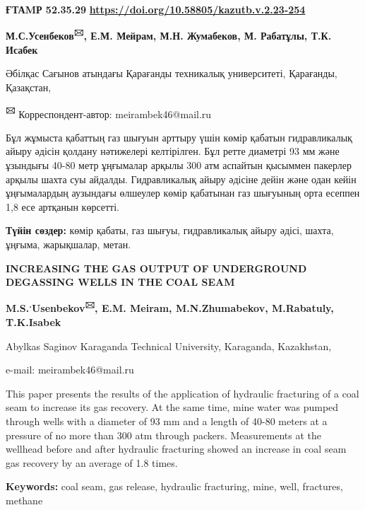 \newpage
{\bfseries ҒТАMР 52.35.29}
\hfill {\bfseries \href{https://doi.org/10.58805/kazutb.v.2.23-254}{https://doi.org/10.58805/kazutb.v.2.23-254}}


\begin{center}
{\bfseries М.С.Усенбеков\textsuperscript{🖂}, Е.М. Мейрам, М.Н. Жумабеков, М. Рабатұлы, Т.К. Исабек}

Әбілқас Сағынов атындағы Қарағанды техникалық университеті, Қарағанды,
Қазақстан,

{\bfseries \textsuperscript{🖂}} Корреспондент-автор: meirambek46@mail.ru
\end{center}

Бұл жұмыста қабаттың газ шығуын арттыру үшін көмір қабатын гидравликалық
айыру әдісін қолдану нәтижелері келтірілген. Бұл ретте диаметрі 93 мм
және ұзындығы 40-80 метр ұңғымалар арқылы 300 атм аспайтын қысыммен
пакерлер арқылы шахта суы айдалды. Гидравликалық айыру әдісіне дейін
және одан кейін ұңғымалардың аузындағы өлшеулер көмір қабатынан газ
шығуының орта есеппен 1,8 есе артқанын көрсетті.

{\bfseries Түйін сөздер:} көмір қабаты, газ шығуы, гидравликалық айыру
әдісі, шахта, ұңғыма, жарықшалар, метан.

\begin{center}
{\large\bfseries INCREASING THE GAS OUTPUT OF UNDERGROUND DEGASSING WELLS IN THE
COAL SEAM}

{\bfseries M.S.\textsuperscript{.}Usenbekov\textsuperscript{🖂}, E.M.
Meiram, M.N.Zhumabekov, M.Rabatuly, T.K.Isabek}

Abylkas Saginov Karaganda Technical University, Karaganda, Kazakhstan,

e-mail: meirambek46@mail.ru
\end{center}

This paper presents the results of the application of hydraulic
fracturing of a coal seam to increase its gas recovery. At the same
time, mine water was pumped through wells with a diameter of 93 mm and a
length of 40-80 meters at a pressure of no more than 300 atm through
packers. Measurements at the wellhead before and after hydraulic
fracturing showed an increase in coal seam gas recovery by an average of
1.8 times.

{\bfseries Keywords:} coal seam, gas release, hydraulic fracturing, mine,
well, fractures, methane

